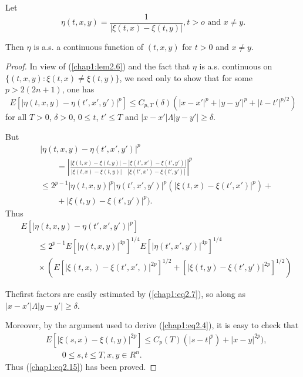 \setcounter{lemma}{13}
\begin{lemma} %
Let
$$
\eta (t,x,y)= \frac{1}{|\xi (t,x)- \xi (t,y)|},t>o \text{ and } x \neq
y. 
$$

Then $\eta$ is a.s. a continuous function of $(t,x,y)$ for $t>0$ and
$x \neq y$. 
\end{lemma}

\begin{proof}
In view of (\ref{chap1:lem2.6}) and the fact that $\eta$ is a.s. continuous on
$\{ (t,x,y):\xi (t,x) \neq \xi (t,y) \}$, we need only to show that
for some $p>2(2n+1)$, one has 
\begin{equation*}
E[|\eta (t,x,y)-\eta (t',x',y')|^p] \le C_{p,T} (\delta)(|x-x'|^p
+|y-y'|^p +|t-t'|^{p/2}) \tag{2.15}\label{chap1:eq2.15}    
\end{equation*}
for all $T>0$, $\delta >0$, $0 \le t$, $t' \le T$ and $|x-x'| \Lambda
|y-y'| \ge \delta$. 

But
\begin{align*}
& |\eta (t,x,y)- \eta (t',x',y')|^p\\[4pt]
& \qquad =|\frac{|\xi(t,x)-\xi (t,y)|-|\xi (t',x')-\xi(t',y')|}{|\xi(t,x)-\xi
  (t,y)| \quad |\xi (t',x')-\xi(t',y')|}|^p \\[4pt]
& \le 2^{p-1}|\eta(t,x,y)|^p |\eta (t',x',y')|^p (|\xi(t,x)-\xi
(t',x')|^p)+\\[4pt]
& \qquad +|\xi (t,y)-\xi (t',y')|^p).
\end{align*}
Thus
\begin{align*}
& E[|\eta(t,x,y)-\eta(t',x',y')|^p]\\
& \qquad \le 2^{p-1}E[|\eta(t,x,y)|^ {4p}]^{1/4} E[|\eta(t',x',y')|
    ^{4p}]^{1/4}\\ 
& \qquad \times (E[|\xi(t,x,)-\xi(t',x',)|^{2p}]^{1/2}
  +[|\xi(t,y)-\xi(t',y')|^{2p}]^{1/2}) 
\end{align*}

The\pageoriginale first factors are easily estimated by (\ref{chap1:eq2.7}), so
along as $|x-x'|\Lambda |y-y'| \ge \delta$.  

Moreover, by the argument used to derive (\ref{chap1:eq2.4}), it is
easy to check 
that 
\begin{align*}
& E [|\xi (s,x)-\xi(t,y)|^{2p}] \le C_p (T) (|s-t|^p)+|x-y|^{2p}),\\
& \qquad  0 \le s,t \le T,x,y \in R^n. \tag{2.16}\label{chap1:eq2.16}    
\end{align*}
 Thus (\ref{chap1:eq2.15}) has been proved.
\end{proof}

